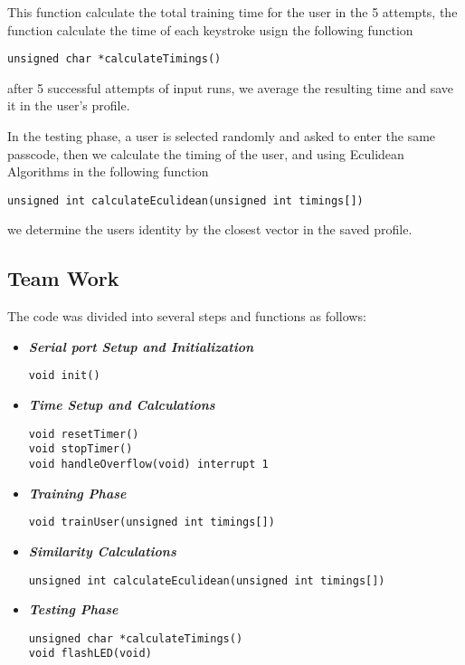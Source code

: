 \documentclass[runningheads]{llncs}
\begin{document}
This function calculate the total training time for the user in the 5 attempts,
the function calculate the time of each keystroke usign the following function
\begin{lstlisting}[style=CStyle]
unsigned char *calculateTimings()
\end{lstlisting}
after 5 successful attempts of input runs, we average the resulting time and save it in the user's profile. \newline \newline 

In the testing phase, a user is selected randomly and asked to enter the same passcode,
then we calculate the timing of the user, and using Eculidean Algorithms in the following function
\begin{lstlisting}[style=CStyle]
unsigned int calculateEculidean(unsigned int timings[])
\end{lstlisting}
we determine the users identity by the closest vector in the saved profile. \newline


\subsection{Team Work}

The code was divided into several steps and functions as follows:
\begin{itemize}
  \setlength\itemsep{2em}

\item \textbf{\textit{Serial port Setup and Initialization}}
\begin{lstlisting}[style=CStyle]
void init()
\end{lstlisting}


\item \textbf{\textit{Time Setup and Calculations}}
\begin{lstlisting}[style=CStyle]
void resetTimer()
void stopTimer()
void handleOverflow(void) interrupt 1
\end{lstlisting}


\item \textbf{\textit{Training Phase}}
\begin{lstlisting}[style=CStyle]
void trainUser(unsigned int timings[])
\end{lstlisting}


\item \textbf{\textit{Similarity Calculations }}
\begin{lstlisting}[style=CStyle]
unsigned int calculateEculidean(unsigned int timings[])
\end{lstlisting}

\item \textbf{\textit{Testing Phase}}
\begin{lstlisting}[style=CStyle]
unsigned char *calculateTimings()
void flashLED(void)
\end{lstlisting}
\end{itemize}
\end{document}
